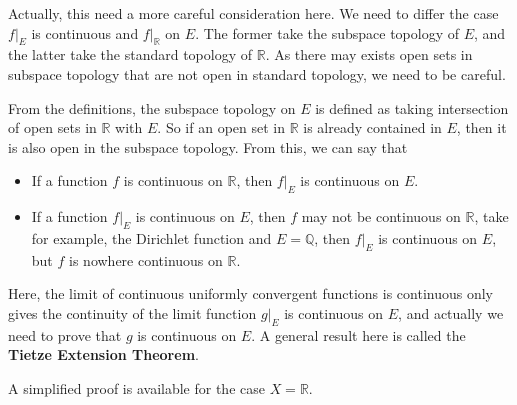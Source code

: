 \documentclass[../main.tex]{subfiles}
\begin{document}
\begin{remark}
	Actually, this need a more careful consideration here. We need to differ the case $f|_E$ is continuous and $f|_{\mathbb{R}}$ on $E$. The former take the subspace topology of $E$, and the latter take the standard topology of $\mathbb{R}$. As there may exists open sets in subspace topology that are not open in standard topology, we need to be careful.

	From the definitions, the subspace topology on $E$ is defined as taking intersection of open sets in $\mathbb{R}$ with $E$. So if an open set in $\mathbb{R}$ is already contained in $E$, then it is also open in the subspace topology. From this, we can say that
	\begin{itemize}
		\item If a function $f$ is continuous on $\mathbb{R}$, then $f|_E$ is continuous on $E$.
		\item If a function $f|_E$ is continuous on $E$, then $f$ may not be continuous on $\mathbb{R}$, take for example, the Dirichlet function and $E = \mathbb{Q}$, then $f|_E$ is continuous on $E$, but $f$ is nowhere continuous on $\mathbb{R}$.
	\end{itemize}

	Here, the limit of continuous uniformly convergent functions is continuous only gives the continuity of the limit function $g|_E$ is continuous on $E$, and actually we need to prove that $g$ is continuous on $E$. A general result here is called the \textbf{Tietze Extension Theorem}.

	A simplified proof is available for the case $X = \mathbb{R}$.
\end{remark}
\end{document}
